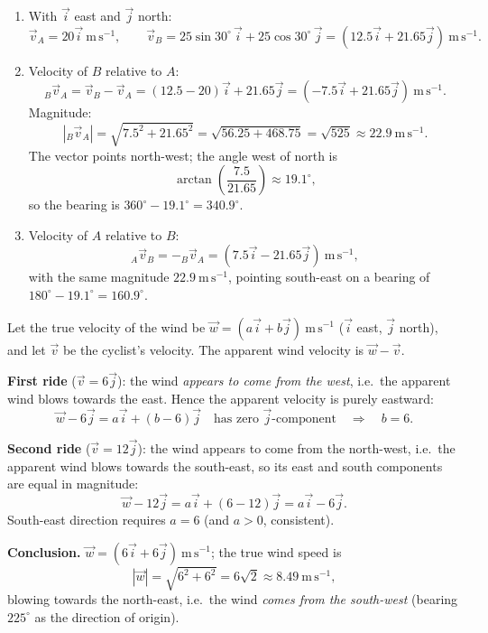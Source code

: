 \documentclass[11pt]{article}
\begin{document}
\begin{corrige}
\begin{enumerate}
\item With $\vec{i}$ east and $\vec{j}$ north:
\[
\vec{v}_A = 20\vec{i}\ \mathrm{m\,s^{-1}}, \qquad
\vec{v}_B = 25\sin 30^{\circ}\,\vec{i} + 25\cos 30^{\circ}\,\vec{j} = (12.5\vec{i} + 21.65\vec{j})\ \mathrm{m\,s^{-1}}.
\]
\item Velocity of $B$ relative to $A$:
\[
{}_B\vec{v}_A = \vec{v}_B - \vec{v}_A = (12.5 - 20)\vec{i} + 21.65\vec{j} = (-7.5\vec{i} + 21.65\vec{j})\ \mathrm{m\,s^{-1}}.
\]
Magnitude:
\[
|{}_B\vec{v}_A| = \sqrt{7.5^2 + 21.65^2} = \sqrt{56.25 + 468.75} = \sqrt{525} \approx 22.9\ \mathrm{m\,s^{-1}}.
\]
The vector points north-west; the angle west of north is
\[
\arctan\!\left(\frac{7.5}{21.65}\right) \approx 19.1^{\circ},
\]
so the bearing is $360^{\circ} - 19.1^{\circ} = \mathbf{340.9^{\circ}}$.
\item Velocity of $A$ relative to $B$:
\[
{}_A\vec{v}_B = -{}_B\vec{v}_A = (7.5\vec{i} - 21.65\vec{j})\ \mathrm{m\,s^{-1}},
\]
with the same magnitude $22.9\ \mathrm{m\,s^{-1}}$, pointing south-east on a bearing of $180^{\circ} - 19.1^{\circ} = \mathbf{160.9^{\circ}}$.
\end{enumerate}
\end{corrige}

\begin{corrige}
Let the true velocity of the wind be $\vec{w} = (a\vec{i} + b\vec{j})\ \mathrm{m\,s^{-1}}$ ($\vec{i}$ east, $\vec{j}$ north), and let $\vec{v}$ be the cyclist's velocity. The apparent wind velocity is $\vec{w} - \vec{v}$.

\textbf{First ride} ($\vec{v} = 6\vec{j}$): the wind \emph{appears to come from the west}, i.e.\ the apparent wind blows towards the east. Hence the apparent velocity is purely eastward:
\[
\vec{w} - 6\vec{j} = a\vec{i} + (b-6)\vec{j} \quad\text{has zero } \vec{j}\text{-component} \quad\Longrightarrow\quad b = 6.
\]

\textbf{Second ride} ($\vec{v} = 12\vec{j}$): the wind appears to come from the north-west, i.e.\ the apparent wind blows towards the south-east, so its east and south components are equal in magnitude:
\[
\vec{w} - 12\vec{j} = a\vec{i} + (6-12)\vec{j} = a\vec{i} - 6\vec{j}.
\]
South-east direction requires $a = 6$ (and $a>0$, consistent).

\textbf{Conclusion.} $\vec{w} = (6\vec{i} + 6\vec{j})\ \mathrm{m\,s^{-1}}$; the true wind speed is
\[
|\vec{w}| = \sqrt{6^2+6^2} = 6\sqrt{2} \approx 8.49\ \mathrm{m\,s^{-1}},
\]
blowing towards the north-east, i.e.\ the wind \emph{comes from the south-west} (bearing $225^{\circ}$ as the direction of origin).
\end{corrige}
\end{document}
